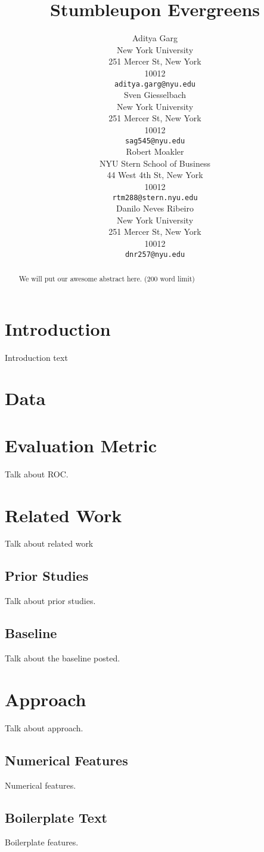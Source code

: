 \documentclass[11pt]{article}
\title{Stumbleupon Evergreens}
\author{Aditya Garg \\
  New York University \\
  251 Mercer St, New York \\
  10012 \\
  {\tt aditya.garg@nyu.edu} \\\And
  Sven Giesselbach \\
  New York University \\
  251 Mercer St, New York \\
  10012 \\
  {\tt sag545@nyu.edu}  \\\AND
  Robert Moakler \\
  NYU Stern School of Business \\
  44 West 4th St, New York \\
  10012 \\
  {\tt rtm288@stern.nyu.edu} \\\And
  Danilo Neves Ribeiro \\
  New York University \\
  251 Mercer St, New York \\
  10012 \\
  {\tt dnr257@nyu.edu} \\}
\date{}
\begin{document}
\maketitle
\begin{abstract}
We will put our awesome abstract here. (200 word limit)
\end{abstract}

\section{Introduction}
\label{sect:introduction}
Introduction text


\section{Data}
\label{sect:data}


\section{Evaluation Metric}
\label{sect:evaluationmetric}
Talk about ROC.


\section{Related Work}
\label{sect:relatedwork}
Talk about related work


\subsection{Prior Studies}
\label{ssect:priorstudies}
Talk about prior studies.


\subsection{Baseline}
\label{ssect:baseline}
Talk about the baseline posted.


\section{Approach}
\label{sect:approach}
Talk about approach.


\subsection{Numerical Features}
\label{ssect:numericalfeatures}
Numerical features.


\subsection{Boilerplate Text}
\label{ssect:boilerplatetext}
Boilerplate features.
\end{document}
